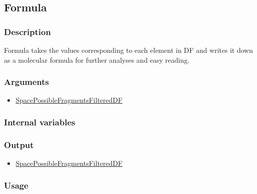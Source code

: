 \subsection{Formula}\label{Formula}
\subsubsection{Description}
Formula takes the values corresponding to each element in DF and writes it down as a molecular formula for further analyses and easy reading.
\subsubsection{Arguments}
\begin{itemize}
\item \hyperref[SpacePossibleFragmentsFilteredDF]{SpacePossibleFragmentsFilteredDF}
\end{itemize}
\subsubsection{Internal variables}
\subsubsection{Output}
\begin{itemize}
\item \hyperref[SpacePossibleFragmentsFilteredDF]{SpacePossibleFragmentsFilteredDF}
\end{itemize}
\subsubsection{Usage}
